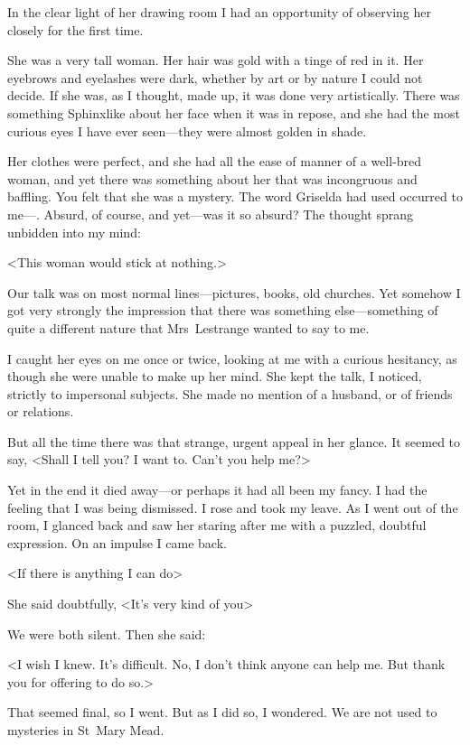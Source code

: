 In the clear light of her drawing room I had an opportunity of observing her closely for the first time.

She was a very tall woman. Her hair was gold with a tinge of red in it. Her eyebrows and eyelashes were dark, whether by art or by nature I could not decide. If she was, as I thought, made up, it was done very artistically. There was something Sphinxlike about her face when it was in repose, and she had the most curious eyes I have ever seen—they were almost golden in shade.

Her clothes were perfect, and she had all the ease of manner of a well-bred woman, and yet there was something about her that was incongruous and baffling. You felt that she was a mystery. The word Griselda had used occurred to me—. Absurd, of course, and yet—was it so absurd? The thought sprang unbidden into my mind:

<This woman would stick at nothing.>

Our talk was on most normal lines—pictures, books, old churches. Yet somehow I got very strongly the impression that there was something else—something of quite a different nature that Mrs~Lestrange wanted to say to me.

I caught her eyes on me once or twice, looking at me with a curious hesitancy, as though she were unable to make up her mind. She kept the talk, I noticed, strictly to impersonal subjects. She made no mention of a husband, or of friends or relations.

But all the time there was that strange, urgent appeal in her glance. It seemed to say, <Shall I tell you? I want to. Can't you help me?>

Yet in the end it died away—or perhaps it had all been my fancy. I had the feeling that I was being dismissed. I rose and took my leave. As I went out of the room, I glanced back and saw her staring after me with a puzzled, doubtful expression. On an impulse I came back.

<If there is anything I can do\longdash>

She said doubtfully, <It's very kind of you\longdash>

We were both silent. Then she said:

<I wish I knew. It's difficult. No, I don't think anyone can help me. But thank you for offering to do so.>

That seemed final, so I went. But as I did so, I wondered. We are not used to mysteries in St~Mary Mead.

